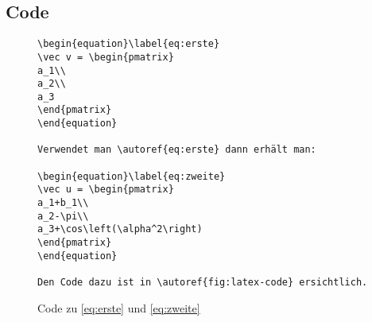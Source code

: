 \subsection{Code}
\begin{figure}[ht]
\centering
\begin{minipage}{0.8\textwidth}
\begin{verbatim}
\begin{equation}\label{eq:erste}
\vec v = \begin{pmatrix}
a_1\\
a_2\\
a_3
\end{pmatrix}
\end{equation}

Verwendet man \autoref{eq:erste} dann erhält man:

\begin{equation}\label{eq:zweite}
\vec u = \begin{pmatrix}
a_1+b_1\\
a_2-\pi\\
a_3+\cos\left(\alpha^2\right)
\end{pmatrix}
\end{equation}

Den Code dazu ist in \autoref{fig:latex-code} ersichtlich.

\end{verbatim}
\end{minipage}
\caption{Code zu \autoref{eq:erste} und \autoref{eq:zweite}}
\label{fig:latex-code}
\end{figure}
